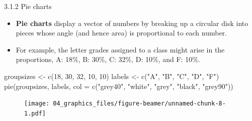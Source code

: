 \documentclass[
  9pt,
  a4paper,
  ignorenonframetext,
  notheorems]{beamer}
\newenvironment{Shaded}{\begin{snugshade}}{\end{snugshade}}
\newcommand{\AttributeTok}[1]{\textcolor[rgb]{0.40,0.45,0.13}{#1}}
\newcommand{\DecValTok}[1]{\textcolor[rgb]{0.68,0.00,0.00}{#1}}
\newcommand{\FunctionTok}[1]{\textcolor[rgb]{0.28,0.35,0.67}{#1}}
\newcommand{\NormalTok}[1]{\textcolor[rgb]{0.00,0.23,0.31}{#1}}
\newcommand{\OtherTok}[1]{\textcolor[rgb]{0.00,0.23,0.31}{#1}}
\newcommand{\StringTok}[1]{\textcolor[rgb]{0.13,0.47,0.30}{#1}}
\begin{document}
\begin{frame}[fragile]{3.1.2 Pie charts}
\protect\hypertarget{pie-charts}{}
\begin{itemize}
\item
  \textbf{Pie charts} display a vector of numbers by breaking up a
  circular disk into pieces whose angle (and hence area) is proportional
  to each number.
\item
  For example, the letter grades assigned to a class might arise in the
  proportions, A: 18\%, B: 30\%, C: 32\%, D: 10\%, and F: 10\%.
\end{itemize}

\begin{Shaded}
\begin{Highlighting}[]
\NormalTok{groupsizes }\OtherTok{\textless{}{-}} \FunctionTok{c}\NormalTok{(}\DecValTok{18}\NormalTok{, }\DecValTok{30}\NormalTok{, }\DecValTok{32}\NormalTok{, }\DecValTok{10}\NormalTok{, }\DecValTok{10}\NormalTok{) }
\NormalTok{labels }\OtherTok{\textless{}{-}} \FunctionTok{c}\NormalTok{(}\StringTok{"A"}\NormalTok{, }\StringTok{"B"}\NormalTok{, }\StringTok{"C"}\NormalTok{, }\StringTok{"D"}\NormalTok{, }\StringTok{"F"}\NormalTok{) }
\FunctionTok{pie}\NormalTok{(groupsizes, labels, }\AttributeTok{col =} \FunctionTok{c}\NormalTok{(}\StringTok{"grey40"}\NormalTok{, }\StringTok{"white"}\NormalTok{, }\StringTok{"grey"}\NormalTok{, }\StringTok{"black"}\NormalTok{, }\StringTok{"grey90"}\NormalTok{))}
\end{Highlighting}
\end{Shaded}

\begin{figure}

{\centering \texttt{[image: 04\_graphics\_files/figure-beamer/unnamed-chunk-8-1.pdf]}

}

\end{figure}
\end{frame}
\end{document}
